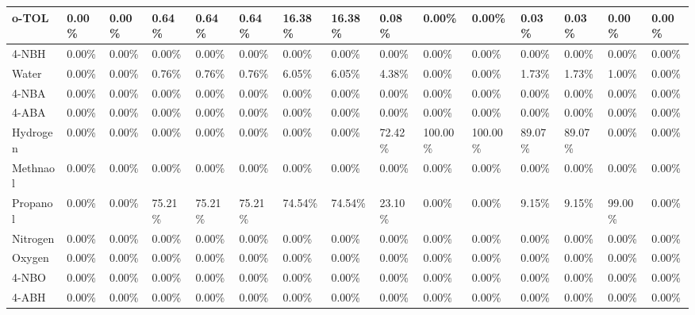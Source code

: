 \begin{landscape}
\begin{table}[H]
\begin{tabular}{|l|l|l|l|l|l|l|l|l|l|l|l|l|l|l|}
o-TOL                   & 0.00\%  & 0.00\%  & 0.64\%  & 0.64\%  & 0.64\%  & 16.38\% & 16.38\% & 0.08\%  & 0.00\%   & 0.00\%   & 0.03\%  & 0.03\%  & 0.00\%  & 0.00\%   \\ \hline
4-NBH                   & 0.00\%  & 0.00\%  & 0.00\%  & 0.00\%  & 0.00\%  & 0.00\%  & 0.00\%  & 0.00\%  & 0.00\%   & 0.00\%   & 0.00\%  & 0.00\%  & 0.00\%  & 0.00\%   \\ \hline
Water                   & 0.00\%  & 0.00\%  & 0.76\%  & 0.76\%  & 0.76\%  & 6.05\%  & 6.05\%  & 4.38\%  & 0.00\%   & 0.00\%   & 1.73\%  & 1.73\%  & 1.00\%  & 0.00\%   \\ \hline
4-NBA                   & 0.00\%  & 0.00\%  & 0.00\%  & 0.00\%  & 0.00\%  & 0.00\%  & 0.00\%  & 0.00\%  & 0.00\%   & 0.00\%   & 0.00\%  & 0.00\%  & 0.00\%  & 0.00\%   \\ \hline
4-ABA                   & 0.00\%  & 0.00\%  & 0.00\%  & 0.00\%  & 0.00\%  & 0.00\%  & 0.00\%  & 0.00\%  & 0.00\%   & 0.00\%   & 0.00\%  & 0.00\%  & 0.00\%  & 0.00\%   \\ \hline
Hydrogen                & 0.00\%  & 0.00\%  & 0.00\%  & 0.00\%  & 0.00\%  & 0.00\%  & 0.00\%  & 72.42\% & 100.00\% & 100.00\% & 89.07\% & 89.07\% & 0.00\%  & 0.00\%   \\ \hline
Methnaol                & 0.00\%  & 0.00\%  & 0.00\%  & 0.00\%  & 0.00\%  & 0.00\%  & 0.00\%  & 0.00\%  & 0.00\%   & 0.00\%   & 0.00\%  & 0.00\%  & 0.00\%  & 0.00\%   \\ \hline
Propanol                & 0.00\%  & 0.00\%  & 75.21\% & 75.21\% & 75.21\% & 74.54\% & 74.54\% & 23.10\% & 0.00\%   & 0.00\%   & 9.15\%  & 9.15\%  & 99.00\% & 0.00\%   \\ \hline
Nitrogen                & 0.00\%  & 0.00\%  & 0.00\%  & 0.00\%  & 0.00\%  & 0.00\%  & 0.00\%  & 0.00\%  & 0.00\%   & 0.00\%   & 0.00\%  & 0.00\%  & 0.00\%  & 0.00\%   \\ \hline
Oxygen                  & 0.00\%  & 0.00\%  & 0.00\%  & 0.00\%  & 0.00\%  & 0.00\%  & 0.00\%  & 0.00\%  & 0.00\%   & 0.00\%   & 0.00\%  & 0.00\%  & 0.00\%  & 0.00\%   \\ \hline
4-NBO                   & 0.00\%  & 0.00\%  & 0.00\%  & 0.00\%  & 0.00\%  & 0.00\%  & 0.00\%  & 0.00\%  & 0.00\%   & 0.00\%   & 0.00\%  & 0.00\%  & 0.00\%  & 0.00\%   \\ \hline
4-ABH                   & 0.00\%  & 0.00\%  & 0.00\%  & 0.00\%  & 0.00\%  & 0.00\%  & 0.00\%  & 0.00\%  & 0.00\%   & 0.00\%   & 0.00\%  & 0.00\%  & 0.00\%  & 0.00\%   \\ \hline

\end{tabular}
\end{table}
\end{landscape}
